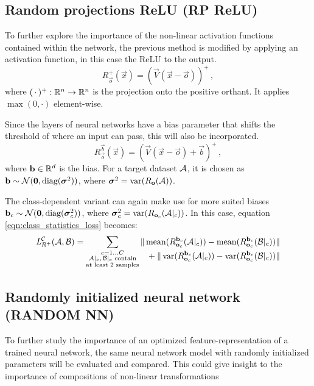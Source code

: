 \subsection{Random projections ReLU (RP ReLU)}
To further explore the importance of the non-linear activation functions contained within the network,
the previous method is modified by applying an activation function, in this case the ReLU to the output.
% 
\[
    R_{\vec o}^+ (\vec x) = (\vec V (\vec x - \vec o))^+ \,,
\]
where $(\,\cdot\,)^+ :\R^n \to \R^n$ is the projection onto the positive orthant. It applies $\max(0, \cdot)$ element-wise.

Since the layers of neural networks have a bias parameter that shifts the threshold of 
where an input can pass, this will also be incorporated.
\[
    R_{\vec o}^{\vec b} (\vec x) = (\vec V (\vec x - \vec o) + \vec b)^+ \,,
\]
where $\vec b \in \R^d$ is the bias. For a target dataset $\set A$, it is chosen as $\vec b \sim \mathcal N(\vec 0, \textnormal{diag}(\boldsymbol \sigma ^2))$, 
where $\boldsymbol \sigma ^2 = \var ({R_{\vec o}(\set A)})$.

The class-dependent variant can again make use for more suited biases $\vec b_c \sim \mathcal N( \vec 0, \textnormal{diag}(\boldsymbol \sigma _c^2))$, 
where $\boldsymbol \sigma_c ^2 = \var ({R_{\vec o_c}(\set A|_c)})$.
In this case, equation \ref{eqn:class_statistics_loss} becomes:
% 
\begin{equation*}
    \loss _{R^+} ^{\mathcal C} (\set A, \set B) =
    \sum _{\substack{c = 1 \dots C \\ \set A|_c,\, \set B|_c \text{ contain} \\ \text{at least 2 samples}}}
    \begin{alignedat}[t]{1}
        \|\mean ({R_{\vec o_c}^{\vec b_c} (\set A|_c)}) - \mean ({R_{\vec o_c}^{\vec b_c} (\set B|_c)}) &\| \\
        {} + \|\var ({R_{\vec o_c}^{\vec b_c} (\set A|_c)}) - \var ({R_{\vec o_c}^{\vec b_c} (\set B|_c)}) &\| 
    \end{alignedat}
\end{equation*}

\subsection{Randomly initialized neural network (RANDOM NN)}
To further study the importance of an optimized feature-representation of a trained neural network, 
the same neural network model with randomly initialized parameters will be evaluated and compared.
This could give insight to the importance of compositions of non-linear transformations

